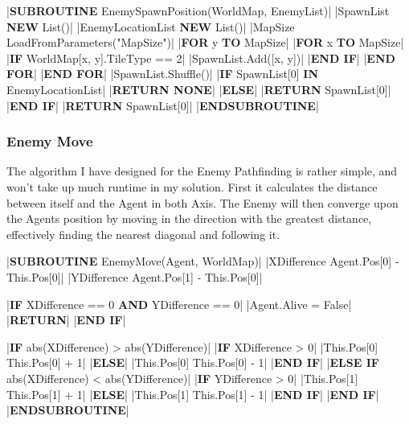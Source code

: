 \begin{flushleft}
                \vspace{0.2cm}
                \begin{pseudocode}
|\textbf{SUBROUTINE} EnemySpawnPosition(WorldMap, EnemyList)|
    |SpawnList \leftarrow \textbf{NEW} List()|
    |EnemyLocationList \leftarrow \textbf{NEW} List()|
    |MapSize \leftarrow LoadFromParameters("MapSize")|
    |\textbf{FOR} y  \textbf{TO} MapSize|
        |\textbf{FOR} x  \textbf{TO} MapSize|
            |\textbf{IF} WorldMap[x, y].TileType == 2|
                |SpawnList.Add([x, y])|
            |\textbf{END IF}|
        |\textbf{END FOR}|
    |\textbf{END FOR}|
    |SpawnList.Shuffle()|
    |\textbf{IF} SpawnList[0] \textbf{IN} EnemyLocationList|
        |\textbf{RETURN NONE}|
    |\textbf{ELSE}|
        |\textbf{RETURN} SpawnList[0]|
    |\textbf{END IF}|
    |\textbf{RETURN} SpawnList[0]|
|\textbf{ENDSUBROUTINE}|
                \end{pseudocode}

                \vspace{0.5cm}
            \subsubsection{Enemy Move}
                The algorithm I have designed for the Enemy Pathfinding is rather simple, and won't take up much runtime in my solution.
                First it calculates the distance between itself and the Agent in both Axis. The Enemy will then converge upon the Agents
                position by moving in the direction with the greatest distance, effectively finding the nearest diagonal and following it.

                \vspace{0.2cm}
                \begin{pseudocode}
|\textbf{SUBROUTINE} EnemyMove(Agent, WorldMap)|
    |XDifference \leftarrow Agent.Pos[0] - This.Pos[0]|
    |YDifference \leftarrow Agent.Pos[1] - This.Pos[0]|

    |\textbf{IF} XDifference == 0 \textbf{AND} YDifference == 0|
        |Agent.Alive = False|
        |\textbf{RETURN}|
    |\textbf{END IF}|

    |\textbf{IF} abs(XDifference) > abs(YDifference)|
        |\textbf{IF} XDifference > 0|
            |This.Pos[0] \leftarrow This.Pos[0] + 1|
        |\textbf{ELSE}|
            |This.Pos[0] \leftarrow This.Pos[0] - 1|
        |\textbf{END IF}|
    |\textbf{ELSE IF} abs(XDifference) < abs(YDifference)|
        |\textbf{IF} YDifference > 0|
            |This.Pos[1] \leftarrow This.Pos[1] + 1|
        |\textbf{ELSE}|
            |This.Pos[1] \leftarrow This.Pos[1] - 1|
        |\textbf{END IF}|
    |\textbf{END IF}|
|\textbf{ENDSUBROUTINE}|
                \end{pseudocode}
                

\end{flushleft}
